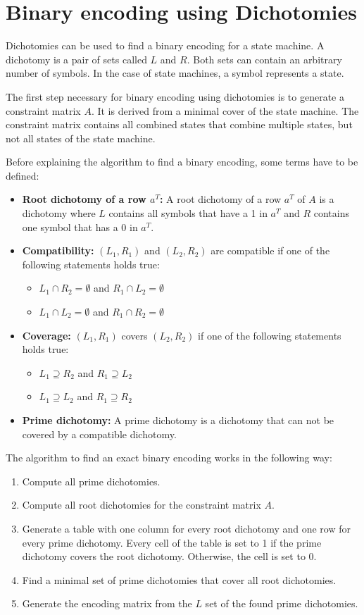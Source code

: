 \chapter{Binary encoding using Dichotomies}

Dichotomies can be used to find a binary encoding for a state machine. A dichotomy is a pair of sets called $L$ and $R$. Both sets can contain an arbitrary number of symbols. In the case of state machines, a symbol represents a state.

The first step necessary for binary encoding using dichotomies is to generate a constraint matrix $A$. It is derived from a minimal cover of the state machine. The constraint matrix contains all combined states that combine multiple states, but not all states of the state machine.

Before explaining the algorithm to find a binary encoding, some terms have to be defined:
\begin{itemize}
\item \textbf{Root dichotomy of a row $a^T$:} A root dichotomy of a row $a^T$ of $A$ is a dichotomy where $L$ contains all symbols that have a 1 in $a^T$ and $R$ contains one symbol that has a 0 in $a^T$.
\item \textbf{Compatibility:} $(L_1,R_1)$ and $(L_2,R_2)$ are compatible if one of the following statements holds true:
\begin{itemize}
\item $L_1 \cap R_2 = \emptyset$ and $R_1 \cap L_2 = \emptyset$
\item $L_1 \cap L_2 = \emptyset$ and $R_1 \cap R_2 = \emptyset$
\end{itemize}
\item \textbf{Coverage:} $(L_1,R_1)$ covers $(L_2,R_2)$ if one of the following statements holds true:
\begin{itemize}
\item $L_1 \supseteq R_2$ and $R_1 \supseteq L_2$
\item $L_1 \supseteq L_2$ and $R_1 \supseteq R_2$
\end{itemize}
\item \textbf{Prime dichotomy:} A prime dichotomy is a dichotomy that can not be covered by a compatible dichotomy.
\end{itemize}

The algorithm to find an exact binary encoding works in the following way:
\begin{enumerate}
\item Compute all prime dichotomies.
\item Compute all root dichotomies for the constraint matrix $A$.
\item Generate a table with one column for every root dichotomy and one row for every prime dichotomy. Every cell of the table is set to 1 if the prime dichotomy covers the root dichotomy. Otherwise, the cell is set to 0.
\item Find a minimal set of prime dichotomies that cover all root dichotomies.
\item Generate the encoding matrix from the $L$ set of the found prime dichotomies.
\end{enumerate}

